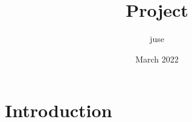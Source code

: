 \documentclass{article}
\title{Project}
\author{juse }
\date{March 2022}
\begin{document}
\maketitle

\section{Introduction}
\end{document}
